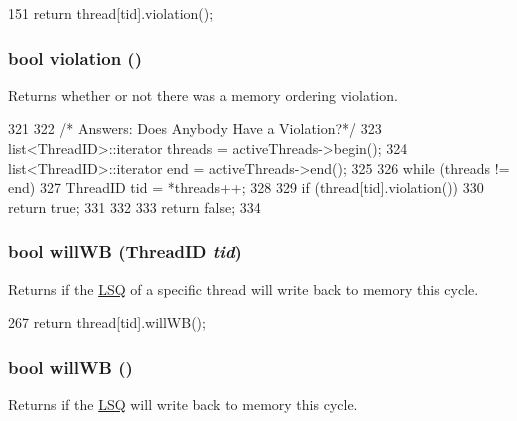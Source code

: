 \begin{DoxyCode}
151     { return thread[tid].violation(); }
\end{DoxyCode}
\hypertarget{classLSQ_a4f720bbfb5fdefdb23516500eeb0b4de}{
\subsubsection[{violation}]{\setlength{\rightskip}{0pt plus 5cm}bool violation ()}}
\label{classLSQ_a4f720bbfb5fdefdb23516500eeb0b4de}
Returns whether or not there was a memory ordering violation. 


\begin{DoxyCode}
321 {
322     /* Answers: Does Anybody Have a Violation?*/
323     list<ThreadID>::iterator threads = activeThreads->begin();
324     list<ThreadID>::iterator end = activeThreads->end();
325 
326     while (threads != end) {
327         ThreadID tid = *threads++;
328 
329         if (thread[tid].violation())
330             return true;
331     }
332 
333     return false;
334 }
\end{DoxyCode}
\hypertarget{classLSQ_a71ae97788e6b1230662807e1b03f47b3}{
\subsubsection[{willWB}]{\setlength{\rightskip}{0pt plus 5cm}bool willWB ({\bf ThreadID} {\em tid})}}
\label{classLSQ_a71ae97788e6b1230662807e1b03f47b3}
Returns if the \hyperlink{classLSQ}{LSQ} of a specific thread will write back to memory this cycle. 


\begin{DoxyCode}
267     { return thread[tid].willWB(); }
\end{DoxyCode}
\hypertarget{classLSQ_a338be821734603396bfef8d9fb8f04b0}{
\subsubsection[{willWB}]{\setlength{\rightskip}{0pt plus 5cm}bool willWB ()}}
\label{classLSQ_a338be821734603396bfef8d9fb8f04b0}
Returns if the \hyperlink{classLSQ}{LSQ} will write back to memory this cycle. 


